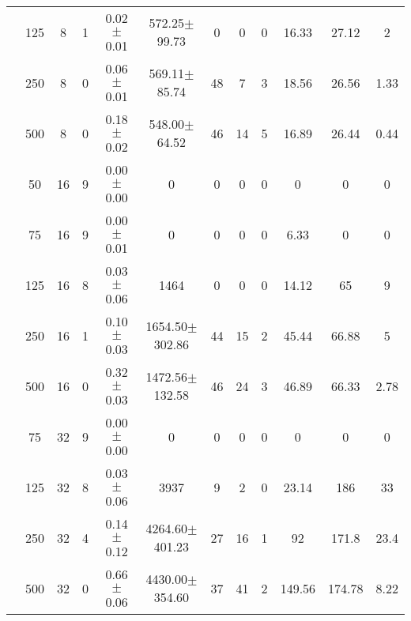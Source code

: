 \documentclass{llncs}
\begin{document}
\begin{table}[h]
\begin{center}
\begin{tabular}{c c c c c c c c c c c c}
&125&8&1&  0.02$\pm$0.01  &  572.25$\pm$99.73    &0&0&0&16.33&27.12&2\\
&250&8&0&  0.06$\pm$0.01  &  569.11$\pm$85.74    &48&7&3&18.56&26.56&1.33\\
&500&8&0&  0.18$\pm$0.02  &  548.00$\pm$64.52    &46&14&5&16.89&26.44&0.44\\
&50&16&9&  0.00$\pm$0.00  &0&0&0&0&0&0&0\\
&75&16&9&  0.00$\pm$0.01  &0&0&0&0&6.33&0&0\\
&125&16&8&  0.03$\pm$0.06  &1464&0&0&0&14.12&65&9\\
&250&16&1&  0.10$\pm$0.03  &  1654.50$\pm$302.86  &44&15&2&45.44&66.88&5\\
&500&16&0&  0.32$\pm$0.03  &  1472.56$\pm$132.58  &46&24&3&46.89&66.33&2.78\\
&75&32&9&  0.00$\pm$0.00  &0&0&0&0&0&0&0\\
&125&32&8&  0.03$\pm$0.06  &3937&9&2&0&23.14&186&33\\
&250&32&4&  0.14$\pm$0.12  &  4264.60$\pm$401.23  &27&16&1&92&171.8&23.4\\
&500&32&0&  0.66$\pm$0.06  &  4430.00$\pm$354.60  &37&41&2&149.56&174.78&8.22\\
\end{tabular}
\end{center}
\end{table}
\end{document}
